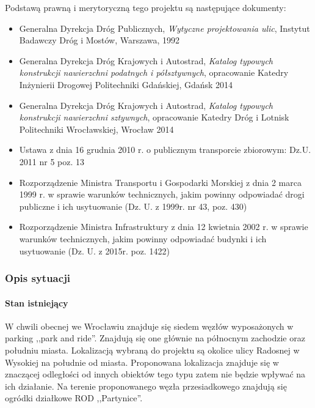 \documentclass[twoside,12pt]{article}
\begin{document}
		Podstawą prawną i merytoryczną tego projektu są następujące dokumenty:
		\begin{itemize}\setlength{\itemsep}{0em}
		\item Generalna Dyrekcja Dróg Publicznych, \emph{Wytyczne projektowania ulic}, Instytut Badawczy Dróg i Mostów, Warszawa, 1992 \cite{wytyczne_ulice}
		\item Generalna Dyrekcja Dróg Krajowych i Autostrad, \emph{Katalog typowych konstrukcji nawierzchni podatnych i półsztywnych}, opracowanie Katedry Inżynierii Drogowej Politechniki Gdańskiej, Gdańsk 2014 \cite{knd_podatne}
		\item Generalna Dyrekcja Dróg Krajowych i Autostrad, \emph{Katalog typowych konstrukcji nawierzchni sztywnych}, opracowanie Katedry Dróg i Lotnisk Politechniki Wrocławskiej, Wrocław 2014 \cite{knd_sztywne}
		\item Ustawa z dnia 16 grudnia 2010 r. o publicznym transporcie zbiorowym: Dz.U. 2011 nr 5 poz. 13 \cite{ustawa_transport}
		\item Rozporządzenie Ministra Transportu i Gospodarki Morskiej z dnia 2 marca 1999 r. w sprawie warunków technicznych, jakim powinny odpowiadać drogi publiczne i ich usytuowanie (Dz. U. z 1999r. nr 43, poz. 430) \cite{rozporzadzenie_drogi}
\item Rozporządzenie Ministra Infrastruktury z dnia 12 kwietnia 2002 r. w sprawie warunków technicznych, jakim powinny odpowiadać budynki i ich usytuowanie (Dz. U. z 2015r. poz. 1422) \cite{warunki_techniczne}
		\end{itemize}
		
		\subsubsection{Opis sytuacji}
		
		\paragraph{Stan istniejący}\mbox{}
		
		W chwili obecnej we Wrocławiu znajduje się siedem węzłów wyposażonych w parking ,,park and ride''. Znajdują się one głównie na północnym zachodzie oraz południu miasta. Lokalizacją wybraną do projektu są okolice ulicy Radosnej w Wysokiej na południe od miasta. Proponowana lokalizacja znajduje się w znaczącej odległości od innych obiektów tego typu zatem nie będzie wpływać na ich działanie. Na terenie proponowanego węzła przesiadkowego znajdują się ogródki działkowe ROD ,,Partynice''. 
		
\end{document}

